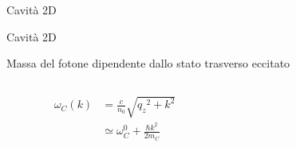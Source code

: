\documentclass[10pt]{beamer}
\begin{document}
\begin{frame}{Cavità 2D}
  
 \end{frame}


\begin{frame}{Cavità 2D}%

  \begin{figure}
    \end{figure}
    
    Massa del fotone dipendente dallo stato trasverso eccitato
    
    \begin{columns}
     \begin{column}{.5\textwidth}
      \begin{align*}
	\omega_C(k) &= \frac{c}{n_0}\sqrt{{q_z}^2 + k^2} \\ 
		&\simeq \omega_C^0 + \frac{\hbar k^2}{2m_C} &&
	\end{align*}
     \end{column}
     
     \begin{column}{.5\textwidth}
      \begin{figure}
      \end{figure}

     \end{column}


    \end{columns}

    
	
\end{frame}
\end{document}
